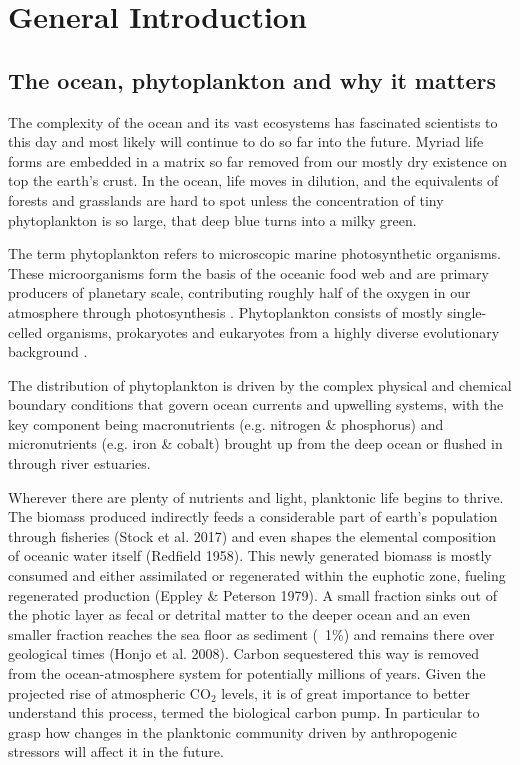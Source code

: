 \chapter{General Introduction}

\section{The ocean, phytoplankton and why it matters}
The complexity of the ocean and its vast ecosystems has fascinated scientists to this day and most likely will continue to do so far into the future. Myriad life forms are embedded in a matrix so far removed from our mostly dry existence on top the earth’s crust. In the ocean, life moves in dilution, and the equivalents of forests and grasslands are hard to spot unless the concentration of tiny phytoplankton is so large, that deep blue turns into a milky green.

The term phytoplankton refers to microscopic marine photosynthetic organisms. These microorganisms form the basis of the oceanic food web and are primary producers of planetary scale, contributing roughly half of the oxygen in our atmosphere through photosynthesis \citep{Field2009}. Phytoplankton consists of mostly single-celled organisms, prokaryotes and eukaryotes from a highly diverse evolutionary background \citep{Falkowski2004a}.

The distribution of phytoplankton is driven by the complex physical and chemical boundary conditions that govern ocean currents and upwelling systems, with the key component being macronutrients (e.g. nitrogen \& phosphorus) and micronutrients (e.g. iron \& cobalt) brought up from the deep ocean or flushed in through river estuaries. 

Wherever there are plenty of nutrients and light, planktonic life begins to thrive. The biomass produced indirectly feeds a considerable part of earth’s population through fisheries (Stock et al. 2017) and even shapes the elemental composition of oceanic water itself (Redfield 1958). 
This newly generated biomass is mostly consumed and either assimilated or regenerated within the euphotic zone, fueling regenerated production (Eppley \& Peterson 1979). A small fraction sinks out of the photic layer as fecal or detrital matter to the deeper ocean and an even smaller fraction reaches the sea floor as sediment (~1\%) and remains there over geological times (Honjo et al. 2008). 
Carbon sequestered this way is removed from the ocean-atmosphere system for potentially millions of years. Given the projected rise of atmospheric CO$_2$ levels, it is of great importance to better understand this process, termed the biological carbon pump. In particular to grasp how changes in the planktonic community driven by anthropogenic stressors will affect it in the future.

